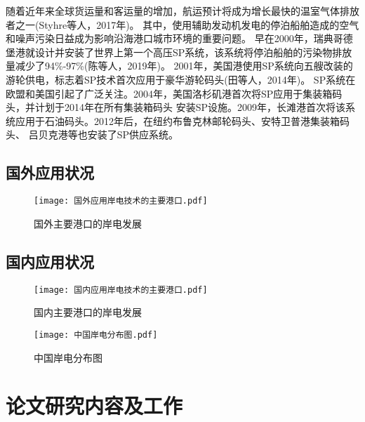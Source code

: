 随着近年来全球货运量和客运量的增加，航运预计将成为增长最快的温室气体排放者之一(Styhre等人，2017年)。
其中，使用辅助发动机发电的停泊船舶造成的空气和噪声污染日益成为影响沿海港口城市环境的重要问题。
早在2000年，瑞典哥德堡港就设计并安装了世界上第一个高压SP系统，该系统将停泊船舶的污染物排放量减少了94\%-97\%(陈等人，2019年)。
2001年，美国港使用SP系统向五艘改装的游轮供电，标志着SP技术首次应用于豪华游轮码头(田等人，2014年)。
SP系统在欧盟和美国引起了广泛关注。2004年，美国洛杉矶港首次将SP应用于集装箱码头，并计划于2014年在所有集装箱码头
安装SP设施。2009年，长滩港首次将该系统应用于石油码头。2012年后，在纽约布鲁克林邮轮码头、安特卫普港集装箱码头、
吕贝克港等也安装了SP供应系统。




\subsection{国外应用状况}


\begin{figure}[!htp]
	\centering
	\texttt{[image: 国外应用岸电技术的主要港口.pdf]}
	\caption{国外主要港口的岸电发展}
	\label{fig:国外主要港口的岸电发展}
\end{figure}


\zhlipsum[6]
\subsection{国内应用状况}


\begin{figure}[!htp]
	\centering
	\texttt{[image: 国内应用岸电技术的主要港口.pdf]}
	\caption{国内主要港口的岸电发展}
	\label{fig:国内主要港口的岸电发展}
\end{figure}




\zhlipsum[7]

\begin{figure}[!htp]
	\centering
	\texttt{[image: 中国岸电分布图.pdf]}
	\caption{中国岸电分布图}
	\label{fig:中国船电分布图}
\end{figure}

\section{论文研究内容及工作}
\zhlipsum[8]
